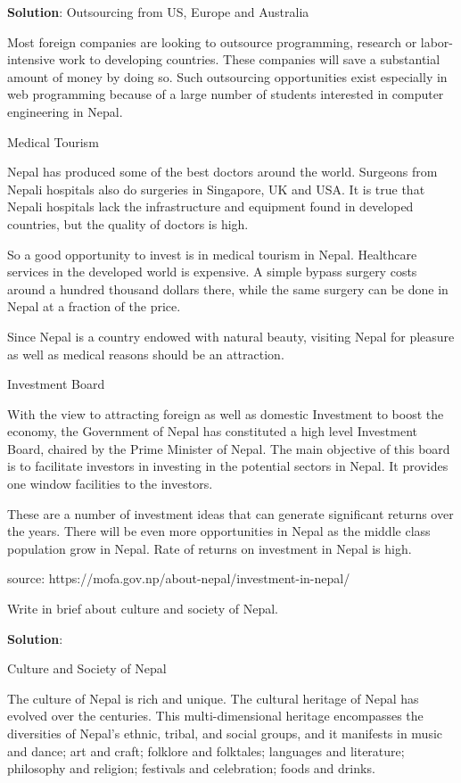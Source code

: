 \documentclass[
]{book}
\newcommand{\question}{\item}
\newenvironment{solution}{ {\bfseries Solution}:}{}
\begin{document}
\begin{questions}
\begin{solution}
Outsourcing from US, Europe and Australia

Most foreign companies are looking to outsource programming, research or labor-intensive work to developing countries. These companies will save a substantial amount of money by doing so. Such outsourcing opportunities exist especially in web programming because of a large number of students interested in computer engineering in Nepal.

Medical Tourism

Nepal has produced some of the best doctors around the world. Surgeons from Nepali hospitals also do surgeries in Singapore, UK and USA. It is true that Nepali hospitals lack the infrastructure and equipment found in developed countries, but the quality of doctors is high.

So a good opportunity to invest is in medical tourism in Nepal. Healthcare services in the developed world is expensive. A simple bypass surgery costs around a hundred thousand dollars there, while the same surgery can be done in Nepal at a fraction of the price.

Since Nepal is a country endowed with natural beauty, visiting Nepal for pleasure as well as medical reasons should be an attraction.

Investment Board

With the view to attracting foreign as well as domestic Investment to boost the economy, the Government of Nepal has constituted a high level Investment Board, chaired by the Prime Minister of Nepal. The main objective of this board is to facilitate investors in investing in the potential sectors in Nepal. It provides one window facilities to the investors.

These are a number of investment ideas that can generate significant returns over the years. There will be even more opportunities in Nepal as the middle class population grow in Nepal. Rate of returns on investment in Nepal is high.

source: https://mofa.gov.np/about-nepal/investment-in-nepal/
\end{solution}

\question Write in brief about culture and society of Nepal.

\begin{solution}

Culture and Society of Nepal

The culture of Nepal is rich and unique. The cultural heritage of Nepal has evolved over the centuries. This multi-dimensional heritage encompasses the diversities of Nepal’s ethnic, tribal, and social groups, and it manifests in music and dance; art and craft; folklore and folktales; languages and literature; philosophy and religion; festivals and celebration; foods and drinks.


\end{solution}
\end{questions}
\end{document}
